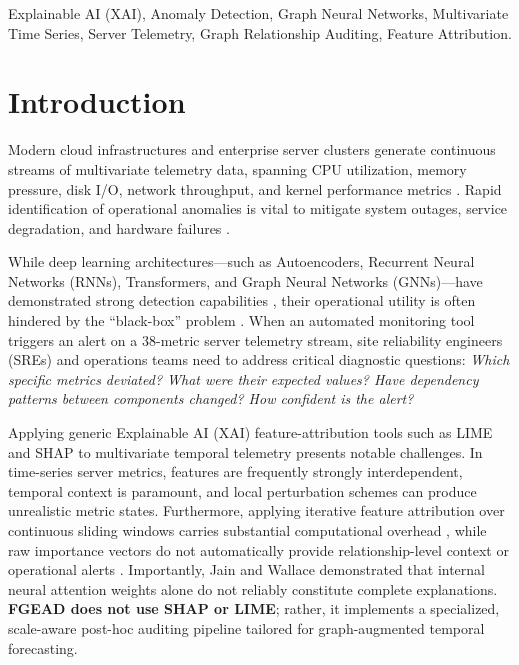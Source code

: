 \documentclass[conference]{IEEEtran}
\begin{document}
\begin{IEEEkeywords}
Explainable AI (XAI), Anomaly Detection, Graph Neural Networks, Multivariate Time Series, Server Telemetry, Graph Relationship Auditing, Feature Attribution.
\end{IEEEkeywords}

\section{Introduction}
Modern cloud infrastructures and enterprise server clusters generate continuous streams of multivariate telemetry data, spanning CPU utilization, memory pressure, disk I/O, network throughput, and kernel performance metrics \cite{wang2025survey}. Rapid identification of operational anomalies is vital to mitigate system outages, service degradation, and hardware failures \cite{su2019omnianomaly}. 

While deep learning architectures—such as Autoencoders, Recurrent Neural Networks (RNNs), Transformers, and Graph Neural Networks (GNNs)—have demonstrated strong detection capabilities \cite{audibert2020usad, xu2022anomaly, deng2021graph}, their operational utility is often hindered by the ``black-box'' problem \cite{barredo2020explainable, rudin2019stop}. When an automated monitoring tool triggers an alert on a 38-metric server telemetry stream, site reliability engineers (SREs) and operations teams need to address critical diagnostic questions: \textit{Which specific metrics deviated? What were their expected values? Have dependency patterns between components changed? How confident is the alert?}

Applying generic Explainable AI (XAI) feature-attribution tools such as LIME \cite{ribeiro2016why} and SHAP \cite{lundberg2017unified} to multivariate temporal telemetry presents notable challenges. In time-series server metrics, features are frequently strongly interdependent, temporal context is paramount, and local perturbation schemes can produce unrealistic metric states. Furthermore, applying iterative feature attribution over continuous sliding windows carries substantial computational overhead \cite{ying2019gnnexplainer}, while raw importance vectors do not automatically provide relationship-level context or operational alerts \cite{tripathy2022explaining}. Importantly, Jain and Wallace \cite{jain2019attention} demonstrated that internal neural attention weights alone do not reliably constitute complete explanations. \textbf{FGEAD does not use SHAP or LIME}; rather, it implements a specialized, scale-aware post-hoc auditing pipeline tailored for graph-augmented temporal forecasting.
\end{document}
